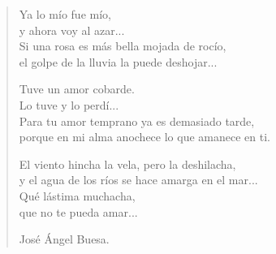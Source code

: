 \documentclass[11pt, portrait, twoside, notitlepage, openright]{book}
\begin{document}
\begin{verse}
Ya lo mío fue mío,\\
y ahora voy al azar...\\
Si una rosa es más bella mojada de rocío,\\
el golpe de la lluvia la puede deshojar...
\newline

Tuve un amor cobarde.\\
Lo tuve y lo perdí...\\
Para tu amor temprano ya es demasiado tarde,\\
porque en mi alma anochece lo que amanece en ti.
\newline

El viento hincha la vela, pero la deshilacha,\\
y el agua de los ríos se hace amarga en el mar...\\
Qué lástima muchacha,\\
que no te pueda amar...
\newline
\begin{flushright}
José Ángel Buesa.
\end{flushright}
\end{verse}
\end{document}
